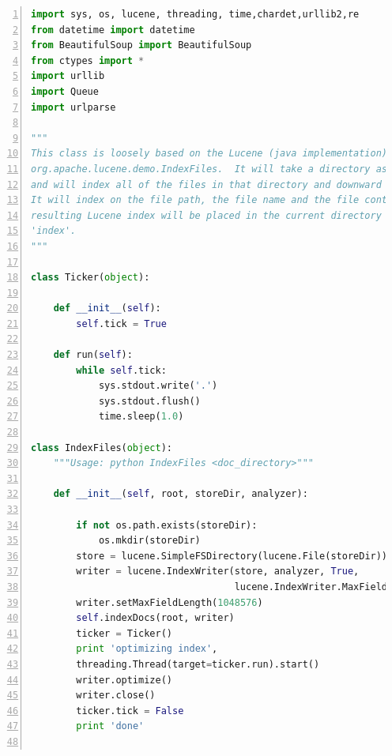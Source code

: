 \documentclass{article}
\begin{document}
\begin{lstlisting}[language=python,numbers=left,frame=leftline]
import sys, os, lucene, threading, time,chardet,urllib2,re
from datetime import datetime
from BeautifulSoup import BeautifulSoup
from ctypes import *
import urllib
import Queue
import urlparse

"""
This class is loosely based on the Lucene (java implementation) demo class
org.apache.lucene.demo.IndexFiles.  It will take a directory as an argument
and will index all of the files in that directory and downward recursively.
It will index on the file path, the file name and the file contents.  The
resulting Lucene index will be placed in the current directory and called
'index'.
"""

class Ticker(object):

    def __init__(self):
        self.tick = True

    def run(self):
        while self.tick:
            sys.stdout.write('.')
            sys.stdout.flush()
            time.sleep(1.0)

class IndexFiles(object):
    """Usage: python IndexFiles <doc_directory>"""

    def __init__(self, root, storeDir, analyzer):

        if not os.path.exists(storeDir):
            os.mkdir(storeDir)
        store = lucene.SimpleFSDirectory(lucene.File(storeDir))
        writer = lucene.IndexWriter(store, analyzer, True,
                                    lucene.IndexWriter.MaxFieldLength.LIMITED)
        writer.setMaxFieldLength(1048576)
        self.indexDocs(root, writer)
        ticker = Ticker()
        print 'optimizing index',
        threading.Thread(target=ticker.run).start()
        writer.optimize()
        writer.close()
        ticker.tick = False
        print 'done'


\end{lstlisting}
\end{document}
